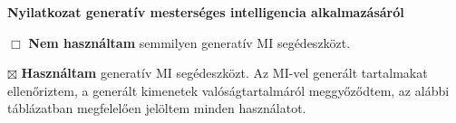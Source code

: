 \begin{center}
\large
\textbf{Nyilatkozat generatív mesterséges intelligencia alkalmazásáról}\\
\end{center}

\noindent $\Box$ \textbf{Nem használtam} semmilyen generatív MI segédeszközt.

\noindent $\boxtimes$ \textbf{Használtam} generatív MI segédeszközt. Az MI-vel generált tartalmakat ellenőriztem, a generált kimenetek valóságtartalmáról meggyőződtem, az alábbi táblázatban megfelelően jelöltem minden használatot.

